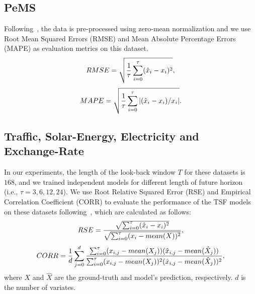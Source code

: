 \documentclass{article}
\begin{document}
\subsection{PeMS}



Following~\citep{Hyndman2006AnotherLA}, the data is pre-processed using zero-mean normalization and we use Root Mean Squared Errors (RMSE) and Mean Absolute Percentage Errors (MAPE) as evaluation metrics on this dataset. 
\begin{equation}
\scriptsize
    RMSE = \sqrt{\frac{1}{\tau}\sum_{i =0}^{\tau}(\hat{x}_i-x_i)^2},
\end{equation}
\begin{equation}
\scriptsize
    MAPE= \sqrt{\frac{1}{\tau}\sum_{i =0}^{\tau}|(\hat{x}_i-x_i )/x_i|}.
\end{equation}













\subsection{Traffic, Solar-Energy, Electricity and Exchange-Rate}


In our experiments, the length of the look-back window $T$ for these datasets is $168$, and we trained independent models for different length of future horizon (i.e., $\tau=3, 6, 12, 24$).
We use Root Relative Squared Error (RSE) and Empirical Correlation Coefficient (CORR) to evaluate the performance of the TSF models on these datasets following~\citep{Lai2018ModelingLA}, which are calculated as follows:
\begin{equation}
\scriptsize
    RSE = \frac{\sqrt{\sum_{i =0}^{\tau}(\hat{x}_i -x_i)^2}}{\sqrt{\sum_{i =0}^{\tau}(x_i-mean(X))^2}},
\end{equation}
\begin{equation}
\scriptsize
    CORR= \frac{1}{d}\sum_{j=0}^{d} \frac{\sum_{i=0}^{ \tau}(x_{i,j}-mean(X_j))(\hat{x}_{i,j}-mean(\hat{X}_j))}{\sum_{i=0}^{  \tau}(x_{i,j}-mean(X_j))^2(\hat{x}_{i,j}-mean(\hat{X}_j))^2},
\end{equation}
where $X$ and $\hat{X}$ are the ground-truth and model's prediction, respectively. $d$ is the number of variates. 
\end{document}
